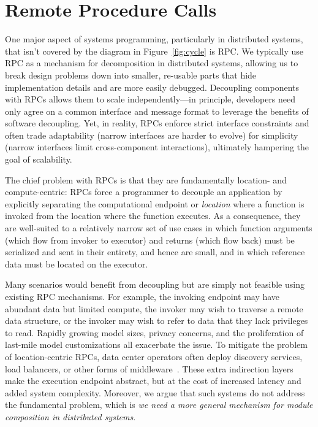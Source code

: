 \section{Remote Procedure Calls}

One major aspect of systems programming, particularly in distributed systems, that isn't covered by the diagram in
Figure~\ref{fig:cycle} is RPC. We typically use RPC as a mechanism for decomposition in distributed systems, allowing us
to break design problems down into smaller, re-usable parts that hide implementation details and are more easily debugged.
Decoupling components with RPCs allows them to scale
independently---in principle, developers need only agree
on a common interface and message format to leverage the
benefits of software decoupling. Yet, in reality,
RPCs enforce strict interface constraints and often
trade adaptability (narrow interfaces are harder to evolve) for
simplicity (narrow interfaces limit cross-component interactions),
ultimately hampering the goal of scalability.


The chief problem with RPCs is that they are fundamentally location-
and compute-centric: RPCs force a
programmer to decouple an application by explicitly separating the
computational endpoint or \emph{location} where a function is invoked
from the location where the function executes.  As a consequence, they are
well-suited to a relatively narrow set of use cases in which
function arguments (which flow from invoker to executor) and
returns (which flow back) must be serialized and sent in their
entirety, and hence are small, and in which reference data must be
located on the executor.


Many scenarios would benefit from decoupling but are simply not feasible using existing RPC
mechanisms. For example, the invoking endpoint may have abundant data but limited
compute, the invoker may wish to traverse a remote data structure, or the invoker may wish to
refer to data that they lack privileges to read. Rapidly growing model sizes, privacy concerns, and the proliferation of last-mile
model customizations all exacerbate the issue.
To mitigate the problem of location-centric RPCs, data center
operators often deploy discovery services, load balancers, or other
forms of middleware~\cite{eisenbud16,katran,tibco,kreps11,mq}. These
extra indirection layers make the execution endpoint abstract, but at
the cost of increased latency and added system complexity. Moreover,
we argue that such systems do not address the fundamental problem,
which is \emph{we need a more general mechanism for module
    composition in distributed systems}.

